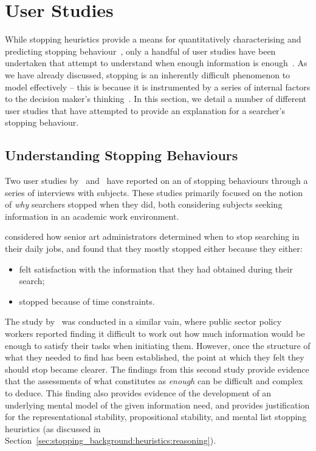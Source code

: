\section{User Studies}\label{sec:stopping_background:user_studies}
While stopping heuristics provide a means for quantitatively characterising and predicting stopping behaviour~\citep{wu2014information_scent}, only a handful of user studies have been undertaken that attempt to understand when enough information is enough~\citep{zach2005enough_is_enough}. As we have already discussed, stopping is an inherently difficult phenomenon to model effectively -- this is because it is instrumented by a series of internal factors to the decision maker's thinking~\citep{nickles1995judgment}. In this section, we detail a number of different user studies that have attempted to provide an explanation for a searcher's stopping behaviour.

\subsection{Understanding Stopping Behaviours}
Two user studies by~\cite{zach2005enough_is_enough} and~\cite{berryman2006defines} have reported on an of stopping behaviours through a series of interviews with subjects. These studies primarily focused on the notion of \emph{why} searchers stopped when they did, both considering subjects seeking information in an academic work environment.

\cite{zach2005enough_is_enough} considered how senior art administrators determined when to stop searching in their daily jobs, and found that they mostly stopped either because they either:

\begin{itemize}
    \item{felt satisfaction with the information that they had obtained during their search;}
    \item{stopped because of time constraints.}
\end{itemize}

The study by~\cite{berryman2006defines} was conducted in a similar vain, where public sector policy workers reported finding it difficult to work out how much information would be enough to satisfy their tasks when initiating them. However, once the structure of what they needed to find has been established, the point at which they felt they should stop became clearer. The findings from this second study provide evidence that the assessments of what constitutes as \emph{enough} can be difficult and complex to deduce. This finding also provides evidence of the development of an underlying mental model of the given information need, and provides justification for the representational stability, propositional stability, and mental list stopping heuristics (as discussed in Section~\ref{sec:stopping_background:heuristics:reasoning}).

